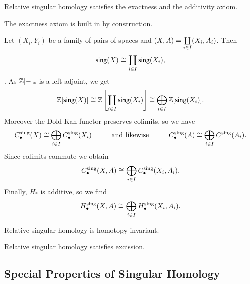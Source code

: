 	\begin{lemma}
		Relative singular homology satisfies the exactness and the additivity axiom.
	\end{lemma}
	\begin{sketch}
		The exactness axiom is built in by construction.

		Let $(X_i,Y_i)$ be a family of pairs of spaces and $(X,A) = \coprod \limits_{i \in I}(X_i,A_i)$. Then 
		\begin{equation*}
			\textsf{sing}(X) \cong \coprod \limits_{i \in I} \textsf{sing}(X_i),
		\end{equation*}
		. As $\mathbb{Z}[-]_{*}$ is a left adjoint, we get 
		\begin{equation*}
			\mathbb{Z}[\textsf{sing}(X)] \cong \mathbb{Z}\left[\coprod \limits_{i \in I} \textsf{sing}(X_i)\right] \cong \bigoplus \limits_{i \in I} \mathbb{Z}[\textsf{sing}(X_i)].
		\end{equation*}
		Moreover the Dold-Kan functor preserves colimits, so we have
		\begin{equation*}
			C_\bullet^\text{sing}(X) \cong \bigoplus \limits_{i \in I} C_\bullet^\text{sing}(X_i) \hspace{1cm}\text{and likewise}\hspace{1cm} C_\bullet^\text{sing}(A) \cong \bigoplus \limits_{i \in I} C^\text{sing}(A_i).
		\end{equation*}
		Since colimits commute we obtain
		\begin{equation*}
			C_\bullet^\text{sing}(X,A) \cong \bigoplus \limits_{i \in I} C_\bullet^\text{sing}(X_i,A_i).
		\end{equation*}
		Finally, $H_{*}$ is additive, so we find
		\begin{equation*}
			H_\bullet^\text{sing}(X,A) \isom \Oplus \limits_{i \in I} H_\bullet^\text{sing}(X_i,A_i).\vspace{-3em}
		\end{equation*}
	\end{sketch}

	\begin{proposition}
		Relative singular homology is homotopy invariant.
	\end{proposition}

	\begin{theorem}
		Relative singular homology satisfies excission.
	\end{theorem}

	\newpage
	\subsection{Special Properties of Singular Homology}

